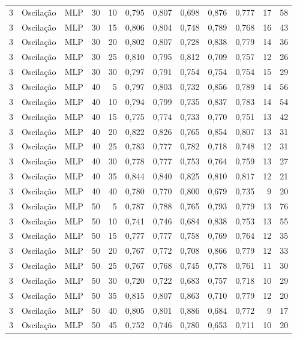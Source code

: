 \begin{longtable}{@{}rllrrrrrrrrr@{}}
3 & Oscilação & MLP & 30 & 10 & 0,795 & 0,807 & 0,698 & 0,876 & 0,777 & 17 & 58 \\
3 & Oscilação & MLP & 30 & 15 & 0,806 & 0,804 & 0,748 & 0,789 & 0,768 & 16 & 43 \\
3 & Oscilação & MLP & 30 & 20 & 0,802 & 0,807 & 0,728 & 0,838 & 0,779 & 14 & 36 \\
3 & Oscilação & MLP & 30 & 25 & 0,810 & 0,795 & 0,812 & 0,709 & 0,757 & 12 & 26 \\
3 & Oscilação & MLP & 30 & 30 & 0,797 & 0,791 & 0,754 & 0,754 & 0,754 & 15 & 29 \\
3 & Oscilação & MLP & 40 & 5 & 0,797 & 0,803 & 0,732 & 0,856 & 0,789 & 14 & 56 \\
3 & Oscilação & MLP & 40 & 10 & 0,794 & 0,799 & 0,735 & 0,837 & 0,783 & 14 & 54 \\
3 & Oscilação & MLP & 40 & 15 & 0,775 & 0,774 & 0,733 & 0,770 & 0,751 & 13 & 42 \\
3 & Oscilação & MLP & 40 & 20 & 0,822 & 0,826 & 0,765 & 0,854 & 0,807 & 13 & 31 \\
3 & Oscilação & MLP & 40 & 25 & 0,783 & 0,777 & 0,782 & 0,718 & 0,748 & 12 & 31 \\
3 & Oscilação & MLP & 40 & 30 & 0,778 & 0,777 & 0,753 & 0,764 & 0,759 & 13 & 27 \\
3 & Oscilação & MLP & 40 & 35 & 0,844 & 0,840 & 0,825 & 0,810 & 0,817 & 12 & 21 \\
3 & Oscilação & MLP & 40 & 40 & 0,780 & 0,770 & 0,800 & 0,679 & 0,735 & 9 & 20 \\
3 & Oscilação & MLP & 50 & 5 & 0,787 & 0,788 & 0,765 & 0,793 & 0,779 & 13 & 76 \\
3 & Oscilação & MLP & 50 & 10 & 0,741 & 0,746 & 0,684 & 0,838 & 0,753 & 13 & 55 \\
3 & Oscilação & MLP & 50 & 15 & 0,777 & 0,777 & 0,758 & 0,769 & 0,764 & 12 & 35 \\
3 & Oscilação & MLP & 50 & 20 & 0,767 & 0,772 & 0,708 & 0,866 & 0,779 & 12 & 33 \\
3 & Oscilação & MLP & 50 & 25 & 0,767 & 0,768 & 0,745 & 0,778 & 0,761 & 11 & 30 \\
3 & Oscilação & MLP & 50 & 30 & 0,720 & 0,722 & 0,683 & 0,757 & 0,718 & 10 & 29 \\
3 & Oscilação & MLP & 50 & 35 & 0,815 & 0,807 & 0,863 & 0,710 & 0,779 & 12 & 20 \\
3 & Oscilação & MLP & 50 & 40 & 0,805 & 0,801 & 0,886 & 0,684 & 0,772 & 9 & 17 \\
3 & Oscilação & MLP & 50 & 45 & 0,752 & 0,746 & 0,780 & 0,653 & 0,711 & 10 & 20 \\

\end{longtable}
